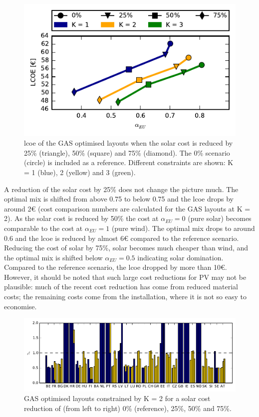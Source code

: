 \documentclass[a4paper, 5p, sort&compress]{elsarticle}%
\begin{document}
\begin{figure}[h!]
  \centering
  \includegraphics[width = \columnwidth]{solarAnalysis-new}
  \caption{\gls{lcoe} of the GAS optimised layouts when the solar cost is
    reduced by 25\% (triangle), 50\% (square) and 75\% (diamond). The
    0\% scenario (circle) is included as a reference. Different
    constraints are shown: K = 1 (blue), 2 (yellow) and 3 (green).}
  \label{fig:red-solar}
\end{figure}

A reduction of the solar cost by 25\% does not change the picture
much. The optimal mix is shifted from above 0.75 to below 0.75 and the
\gls{lcoe} drops by around 2\euro{} (cost comparison numbers are calculated
for the GAS layouts at K = 2).  As the solar cost is reduced by 50\%
the cost at $\alpha_{EU} = 0$ (pure solar) becomes comparable to the
cost at $\alpha_{EU} = 1$ (pure wind). The optimal mix drops to around
0.6 and the \gls{lcoe} is reduced by almost 6\euro{} compared to the
reference scenario. Reducing the cost of solar by 75\%, solar becomes
much cheaper than wind, and the optimal mix is shifted below
$\alpha_{EU} = 0.5$ indicating solar domination. Compared to the
reference scenario, the \gls{lcoe} dropped by more than 10\euro. However, it
should be noted that such large cost reductions for PV may not be
plausible: much of the recent cost reduction  has come from reduced material costs; the remaining costs come from the installation, where it is not so easy to economise.

\begin{figure}[t!]
  \centering
  \includegraphics[width = 2\columnwidth, center]{solarAnalysis-layouts}
  \caption{GAS optimised layouts constrained by K = 2 for a solar cost
    reduction of (from left to right) 0\% (reference), 25\%, 50\% and
    75\%.}
  \label{fig:layout-offshore}
\end{figure}
\end{document}
